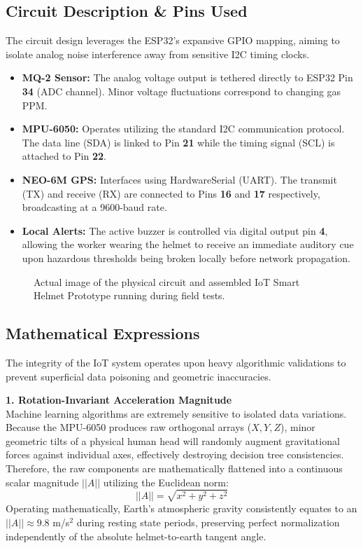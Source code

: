 \documentclass[11pt, conference, a4paper]{IEEEtran}
\begin{document}
\subsection{Circuit Description \& Pins Used}
The circuit design leverages the ESP32's expansive GPIO mapping, aiming to isolate analog noise interference away from sensitive I2C timing clocks.
\begin{itemize}
    \item \textbf{MQ-2 Sensor:} The analog voltage output is tethered directly to ESP32 Pin \textbf{34} (ADC channel). Minor voltage fluctuations correspond to changing gas PPM.
    \item \textbf{MPU-6050:} Operates utilizing the standard I2C communication protocol. The data line (SDA) is linked to Pin \textbf{21} while the timing signal (SCL) is attached to Pin \textbf{22}.
    \item \textbf{NEO-6M GPS:} Interfaces using HardwareSerial (UART). The transmit (TX) and receive (RX) are connected to Pins \textbf{16} and \textbf{17} respectively, broadcasting at a 9600-baud rate.
    \item \textbf{Local Alerts:} The active buzzer is controlled via digital output pin \textbf{4}, allowing the worker wearing the helmet to receive an immediate auditory cue upon hazardous thresholds being broken locally before network propagation.
\end{itemize}

\begin{figure}[ht]
\centering
\fbox{\rule{0pt}{2.5in} \rule{0.85\columnwidth}{0pt}}
\caption{Actual image of the physical circuit and assembled IoT Smart Helmet Prototype running during field tests.}
\label{fig:circuit}
\end{figure}

\subsection{Mathematical Expressions}
The integrity of the IoT system operates upon heavy algorithmic validations to prevent superficial data poisoning and geometric inaccuracies. 

\textbf{1. Rotation-Invariant Acceleration Magnitude} \\
Machine learning algorithms are extremely sensitive to isolated data variations. Because the MPU-6050 produces raw orthogonal arrays ($X, Y, Z$), minor geometric tilts of a physical human head will randomly augment gravitational forces against individual axes, effectively destroying decision tree consistencies. Therefore, the raw components are mathematically flattened into a continuous scalar magnitude $||A||$ utilizing the Euclidean norm:
\begin{equation}
||A|| = \sqrt{x^2 + y^2 + z^2}
\end{equation}
Operating mathematically, Earth's atmospheric gravity consistently equates to an $||A|| \approx 9.8$ m/s$^2$ during resting state periods, preserving perfect normalization independently of the absolute helmet-to-earth tangent angle.
\end{document}
